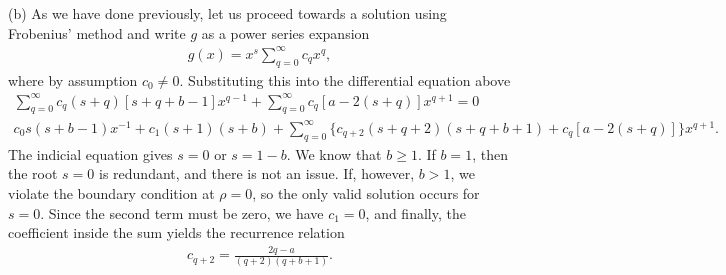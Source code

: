{(b) As we have done previously, let us proceed towards a solution using Frobenius' method and write $g$ as a power series expansion
\begin{eqnarray}
    g(x) = x^{s} \sum_{q=0}^{\infty} c_{q} x^{q}
,\end{eqnarray}
where by assumption $c_{0} \ne 0$.
Substituting this into the differential equation above
\begin{gather}
    \sum_{q=0}^{\infty} c_{q} (s + q) [ s + q + b - 1 ] x^{q-1} + \sum_{q=0}^{\infty} c_{q}[ a - 2(s+q) ] x^{q+1} = 0 \nonumber \\
    c_0 s(s + b - 1) x^{-1} + c_1 (s + 1)(s+b) + \sum_{q=0}^{\infty} \{ c_{q+2} (s + q + 2)(s + q + b + 1) + c_{q} [ a - 2(s+q) ] \} x^{q+1}
.\end{gather}
The indicial equation gives $s = 0$ or $s = 1 - b$.
We know that $b \geq 1$.
If $b = 1$, then the root $s = 0$ is redundant, and there is not an issue.
If, however, $b > 1$, we violate the boundary condition at $\rho = 0$, so the only valid solution occurs for $s = 0$.
Since the second term must be zero, we have $c_1 = 0$, and finally, the coefficient inside the sum yields the recurrence relation
\begin{eqnarray}
    c_{q+2} = \frac{2q - a}{(q+2)(q+b+1)}
.\end{eqnarray}

}
